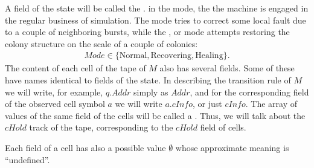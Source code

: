 \documentclass[12pt]{memoir}
\newcommand{\fld}[1]{\ensuremath{\textit{#1}}}
\newcommand{\Addr}{\fld{Addr}}
\newcommand{\cHold}{\fld{cHold}}
\newcommand{\cInfo}{\fld{cInfo}}
\newcommand{\Mode}{\fld{Mode}}
\newcommand{\Healing}{\mathrm{Healing}}
\newcommand{\Normal}{\mathrm{Normal}}
\newcommand{\Recovering}{\mathrm{Recovering}}
\begin{document}
A field of the state will be called the .
in the  mode, the the machine is engaged 
in the regular business of simulation.
The  mode tries to correct some local fault due to a couple of neighboring
bursts, while the , or  mode attempts restoring the colony structure
on the scale of a couple of colonies:
 \begin{align*}
   \Mode\in\{ \Normal,\Recovering, \Healing \}.
 \end{align*}
The content of each cell of the tape of \( M \) also has several fields.
Some of these have names identical to fields of the state.
In describing the transition rule of \( M \) we will write, for example,
\( q.\Addr \) simply as \( \Addr \), and for the corresponding field of the
observed cell symbol \( a \) we will write \( a.\cInfo \), or just \( \cInfo \).
The array of values of the same field of the cells will be called a .
Thus, we will talk about the \( \cHold \) track of the tape, corresponding to the
\( \cHold \) field of cells.

Each field of a cell has also a possible value
\( \emptyset \) whose approximate meaning is ``undefined''.
\end{document}
